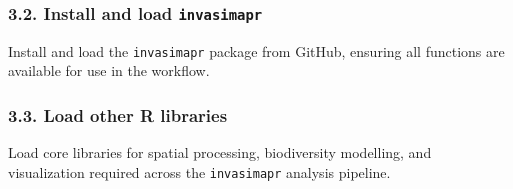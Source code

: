 \documentclass[
]{article}
\newenvironment{Shaded}{\begin{snugshade}}{\end{snugshade}}
\newcommand{\CommentTok}[1]{\textcolor[rgb]{0.56,0.35,0.01}{\textit{#1}}}
\newcommand{\FunctionTok}[1]{\textcolor[rgb]{0.13,0.29,0.53}{\textbf{#1}}}
\newcommand{\NormalTok}[1]{#1}
\newcommand{\SpecialCharTok}[1]{\textcolor[rgb]{0.81,0.36,0.00}{\textbf{#1}}}
\begin{document}
\hypertarget{install-and-load-invasimapr}{%
\subsubsection{\texorpdfstring{3.2. Install and load
\texttt{invasimapr}}{3.2. Install and load invasimapr}}\label{install-and-load-invasimapr}}

Install and load the \texttt{invasimapr} package from GitHub, ensuring
all functions are available for use in the workflow.

\begin{Shaded}
\end{Shaded}

\hypertarget{load-other-r-libraries}{%
\subsubsection{3.3. Load other R
libraries}\label{load-other-r-libraries}}

Load core libraries for spatial processing, biodiversity modelling, and
visualization required across the \texttt{invasimapr} analysis pipeline.
\end{document}
